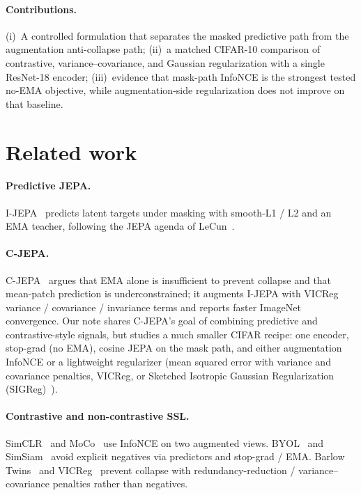 \documentclass[11pt,twocolumn]{article}
\begin{document}
\paragraph{Contributions.}
(i)~A controlled formulation that separates the masked predictive path from
the augmentation anti-collapse path;
(ii)~a matched CIFAR-10 comparison of contrastive, variance--covariance, and
Gaussian regularization with a single ResNet-18 encoder;
(iii)~evidence that mask-path InfoNCE is the strongest tested no-EMA objective,
while augmentation-side regularization does not improve on that baseline.

\section{Related work}
\label{sec:related}

\paragraph{Predictive JEPA.}
I-JEPA~\citep{assran2023ijepa} predicts latent targets under masking with
smooth-L1 / L2 and an EMA teacher, following the JEPA agenda of
LeCun~\citep{lecun2022path}.
\paragraph{C-JEPA.}
C-JEPA~\citep{mo2024cjepa} argues that EMA alone is insufficient to
prevent collapse and that mean-patch prediction is underconstrained; it
augments I-JEPA with VICReg~\citep{bardes2022vicreg} variance / covariance /
invariance terms and reports faster ImageNet convergence.
Our note shares C-JEPA's goal of combining predictive and contrastive-style
signals, but studies a much smaller CIFAR recipe: one encoder, stop-grad (no
EMA), cosine JEPA on the mask path, and either augmentation InfoNCE or a lightweight
regularizer (mean squared error with variance and covariance penalties, VICReg,
or Sketched Isotropic Gaussian Regularization (SIGReg)~\citep{balestriero2025lejepa}).

\paragraph{Contrastive and non-contrastive SSL.}
SimCLR~\citep{chen2020simclr} and MoCo~\citep{he2020moco} use InfoNCE on two
augmented views.
BYOL~\citep{grill2020byol} and SimSiam~\citep{chen2021simsiam} avoid
explicit negatives via predictors and stop-grad / EMA.
Barlow Twins~\citep{zbontar2021barlow} and VICReg~\citep{bardes2022vicreg}
prevent collapse with redundancy-reduction / variance--covariance penalties
rather than negatives.
\end{document}
